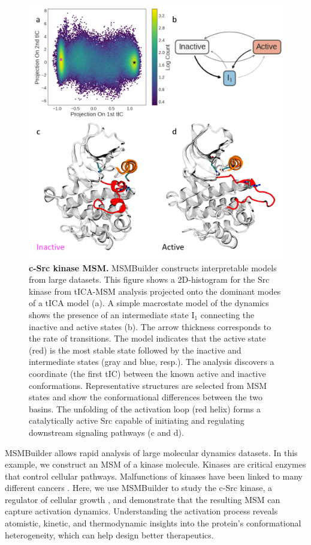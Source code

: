 \begin{figure}[htbp]
\centering
\includegraphics[width=\linewidth]{1-src/plot}
\caption{\textbf{c-Src kinase MSM.}
    MSMBuilder constructs interpretable models from large datasets.  This
    figure shows a 2D-histogram for the Src kinase from tICA-MSM analysis
    projected onto the dominant modes of a tICA model (a).  A simple
    macrostate model of the dynamics shows the presence of an intermediate
    state I$_1$ connecting the inactive and active states (b). The arrow
    thickness corresponds to the rate of transitions. The model
    indicates that the active state (red) is the most stable state followed
    by the inactive and intermediate states (gray and blue, resp.).
    The analysis discovers a coordinate (the first tIC) between the known
    active and inactive conformations. Representative structures
    are selected from MSM states and show the conformational differences
    between the two basins. The unfolding of the activation loop (red
    helix) forms a catalytically active Src capable of initiating and
    regulating downstream signaling pathways (c and d). 
}
\label{fig:src}
\end{figure}

MSMBuilder allows rapid analysis of large molecular dynamics datasets. In
this example, we construct an MSM of a kinase molecule.  Kinases are
critical enzymes that control cellular pathways. Malfunctions of kinases
have been linked to many different cancers
\cite{Taylor_TrendsBiochemSci11}.  Here, we use MSMBuilder to study the
c-Src kinase, a regulator of cellular growth \cite{Shukla_NatCommun14}, and
demonstrate that the resulting MSM can capture activation dynamics.
Understanding the activation process reveals atomistic, kinetic,
and thermodynamic insights into the protein's conformational
heterogeneity, which can help design better therapeutics.

